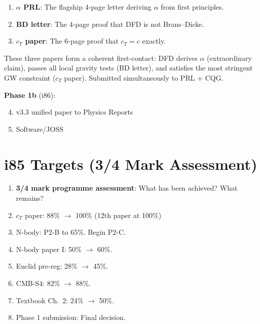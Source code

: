 \documentclass[11pt,a4paper]{article}
\begin{document}
\begin{tcolorbox}[colback=blue!5!white, colframe=blue!50!black, title=\textbf{Phase 1 Submission Package (i85)}]
\begin{enumerate}[nosep]
\item \textbf{$\alpha$ PRL}: The flagship 4-page letter deriving $\alpha$ from first principles.
\item \textbf{BD letter}: The 4-page proof that DFD is not Brans--Dicke.
\item \textbf{$c_T$ paper}: The 6-page proof that $c_T = c$ exactly.
\end{enumerate}
These three papers form a coherent first-contact: DFD derives $\alpha$ (extraordinary claim), passes all local gravity tests (BD letter), and satisfies the most stringent GW constraint ($c_T$ paper). Submitted simultaneously to PRL + CQG.

\textbf{Phase 1b} (i86):
\begin{enumerate}[nosep]
\setcounter{enumi}{3}
\item v3.3 unified paper to Physics Reports
\item Software/JOSS
\end{enumerate}
\end{tcolorbox}

\section{i85 Targets (3/4 Mark Assessment)}

\begin{enumerate}[nosep]
\item \textbf{3/4 mark programme assessment}: What has been achieved? What remains?
\item $c_T$ paper: 88\% $\to$ 100\% (12th paper at 100\%)
\item N-body: P2-B to 65\%. Begin P2-C.
\item N-body paper I: 50\% $\to$ 60\%.
\item Euclid pre-reg: 28\% $\to$ 45\%.
\item CMB-S4: 82\% $\to$ 88\%.
\item Textbook Ch.\ 2: 24\% $\to$ 50\%.
\item Phase 1 submission: Final decision.
\end{enumerate}
\end{document}
